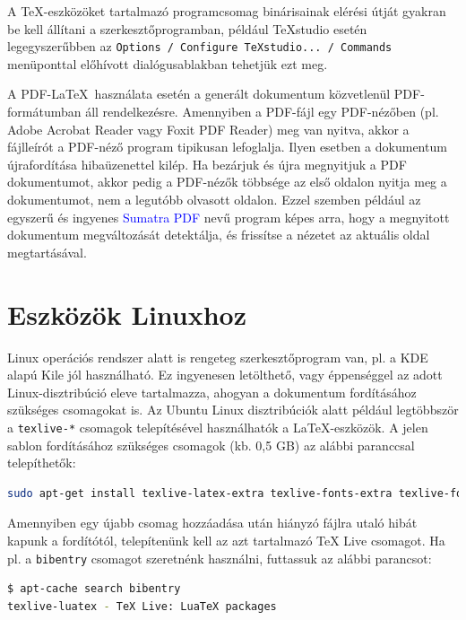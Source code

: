 A \TeX-eszközöket tartalmazó programcsomag binárisainak elérési útját gyakran be kell állítani a szerkesztőprogramban, például TeXstudio esetén legegyszerűbben az \verb+Options / Configure TeXstudio... / Commands+ menüponttal előhívott dialógusablakban tehetjük ezt meg.

A PDF-\LaTeX~használata esetén a generált dokumentum közvetlenül PDF-formátumban áll rendelkezésre. Amennyiben a PDF-fájl egy PDF-nézőben (pl. Adobe Acrobat Reader vagy Foxit PDF Reader) meg van nyitva, akkor a fájlleírót a PDF-néző program tipikusan lefoglalja. Ilyen esetben a dokumentum újrafordítása hibaüzenettel kilép. Ha bezárjuk és újra megnyitjuk a PDF dokumentumot, akkor pedig a PDF-nézők többsége az első oldalon nyitja meg a dokumentumot, nem a legutóbb olvasott oldalon. Ezzel szemben például az egyszerű és ingyenes \textcolor{blue}{Sumatra PDF} nevű program képes arra, hogy a megnyitott dokumentum megváltozását detektálja, és frissítse a nézetet az aktuális oldal megtartásával.

\section{Eszközök Linuxhoz}
Linux operációs rendszer alatt is rengeteg szerkesztőprogram van, pl. a KDE alapú Kile jól használható. Ez ingyenesen letölthető, vagy éppenséggel az adott Linux-disztribúció eleve tartalmazza, ahogyan a dokumentum fordításához szükséges csomagokat is. Az Ubuntu Linux disztribúciók alatt például legtöbbször a \verb+texlive-*+ csomagok telepítésével használhatók a \LaTeX-eszközök. A jelen sablon fordításához szükséges csomagok (kb. 0,5 GB) az alábbi paranccsal telepíthetők:

\begin{lstlisting}[language=bash,morekeywords={sudo,apt\-get},alsoletter={-},breaklines=true]
sudo apt-get install texlive-latex-extra texlive-fonts-extra texlive-fonts-recommended texlive-xetex texlive-science
\end{lstlisting}

Amennyiben egy újabb csomag hozzáadása után hiányzó fájlra utaló hibát kapunk a fordítótól, telepítenünk kell az azt tartalmazó TeX Live csomagot. Ha pl. a \verb+bibentry+ csomagot szeretnénk használni, futtassuk az alábbi parancsot:

\begin{lstlisting}[language=bash,morekeywords={apt\-cache},alsoletter={-},breaklines=true]
$ apt-cache search bibentry
texlive-luatex - TeX Live: LuaTeX packages
\end{lstlisting}

